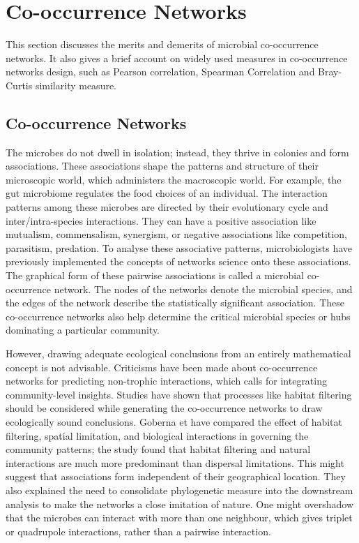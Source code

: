\chapter{Co-occurrence Networks}
 \setcounter{page}{16}

This section discusses the merits and demerits of microbial co-occurrence networks. It also gives a brief account on widely used measures in co-occurrence networks design, such as Pearson correlation, Spearman Correlation and Bray-Curtis similarity measure.

\section{Co-occurrence Networks}
The microbes do not dwell in isolation; instead, they thrive in colonies and form associations. These associations shape the patterns and structure of their microscopic world, which administers the macroscopic world.  For example, the gut microbiome regulates the food choices of an individual. The interaction patterns among these microbes are directed by their evolutionary cycle and inter/intra-species interactions. They can have a positive association like mutualism, commensalism, synergism, or negative associations like competition, parasitism, predation. To analyse these associative patterns, microbiologists have previously implemented the concepts of networks science onto these associations. The graphical form of these pairwise associations is called a microbial co-occurrence network. The nodes of the networks denote the microbial species, and the edges of the network describe the statistically significant association. These co-occurrence networks also help determine the critical microbial species or hubs dominating a particular community.\newline

However, drawing adequate ecological conclusions from an entirely mathematical concept is not advisable. Criticisms have been made about co-occurrence networks for predicting non-trophic interactions, which calls for integrating community-level insights. Studies have shown that processes like habitat filtering should be considered while generating the co-occurrence networks to draw ecologically sound conclusions. Goberna et have compared the effect of habitat filtering, spatial limitation, and biological interactions in governing the community patterns; the study found that habitat filtering and natural interactions are much more predominant than dispersal limitations. This might suggest that associations form independent of their geographical location. They also explained the need to consolidate phylogenetic measure into the downstream analysis to make the networks a close imitation of nature. One might overshadow that the microbes can interact with more than one neighbour, which gives triplet or quadrupole interactions, rather than a pairwise interaction.

